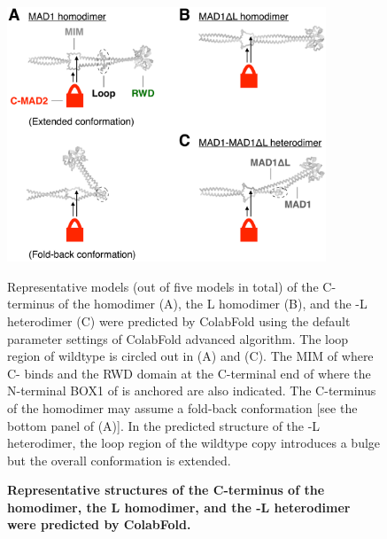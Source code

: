 \begin{figure}
    \centering
    \includegraphics[width=0.85\textwidth]{chapters/figures/ColabFoldPrediction.pdf}
    \caption{\textbf{Representative structures of the C-terminus of the  homodimer, the \textDelta{}L homodimer, and the -\textDelta{}L heterodimer were predicted by ColabFold.}}
    \noindent\justifying Representative models (out of five models in total) of the C-terminus of the  homodimer (A), the \textDelta{}L homodimer (B), and the -\textDelta{}L heterodimer (C) were predicted by ColabFold using the default parameter settings of ColabFold advanced algorithm. The loop region of wildtype  is circled out in (A) and (C). The MIM of  where C- binds and the RWD domain at the C-terminal end of  where the N-terminal BOX1 of  is anchored are also indicated. The C-terminus of the  homodimer may assume a fold-back conformation [see the bottom panel of (A)]. In the predicted structure of the -\textDelta{}L heterodimer, the loop region of the wildtype copy introduces a bulge but the overall conformation is extended. 
    \label{ColabFoldPrediction}
\end{figure}

